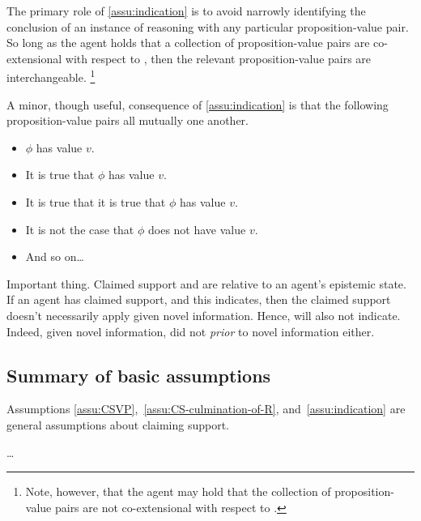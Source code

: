 \begin{note}
  The primary role of \autoref{assu:indication} is to avoid narrowly identifying the conclusion of an instance of reasoning with any particular proposition-value pair.
  So long as the agent holds that a collection of proposition-value pairs are co-extensional with respect to , then the relevant proposition-value pairs are interchangeable.\nolinebreak
  \footnote{
    Note, however, that the agent may hold that the collection of proposition-value pairs are not co-extensional with respect to .
  }
\end{note}

\begin{note}
  A minor, though useful, consequence of \autoref{assu:indication} is that the following proposition-value pairs all mutually \indicateN{} one another.
  \begin{itemize}
  \item \(\phi\) has value \(v\).
  \item It is true that \(\phi\) has value \(v\).
  \item It is true that it is true that \(\phi\) has value \(v\).
  \item It is not the case that \(\phi\) does not have value \(v\).
  \item And so on\dots
  \end{itemize}
\end{note}

\begin{note}
  \color{red}
  Important thing.
  Claimed support and  are relative to an agent's epistemic state.
  If an agent has claimed support, and this indicates, then the claimed support doesn't necessarily apply given novel information.
  Hence, will also not indicate.
  Indeed, given novel information, did not \indicateN{} \emph{prior} to novel information either.
\end{note}

\subsection{Summary of basic assumptions}
\label{sec:summary}

\begin{note}
  Assumptions \ref{assu:CSVP},~\ref{assu:CS-culmination-of-R}, and~\ref{assu:indication} are general assumptions about claiming support.

\color{red} \dots
\end{note}

